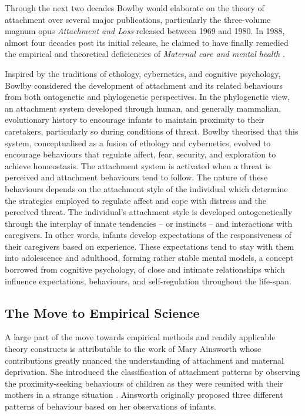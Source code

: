 \documentclass[12pt]{report}
\begin{document}
Through the next two decades Bowlby would elaborate on the theory of attachment over several major publications, particularly the three-volume magnum opus \textit{Attachment and Loss} \cite{Bowlby1969attachment, Bowlby1973separation,Bowlby1980loss} released between 1969 and 1980.
In 1988, almost four decades post its initial release, he claimed to have finally remedied the empirical and theoretical deficiencies of \textit{Maternal care and mental health} \cite{Bowlby1988}.

Inspired by the traditions of ethology, cybernetics, and cognitive psychology, Bowlby considered the development of attachment and its related behaviours from both ontogenetic and phylogenetic perspectives.
In the phylogenetic view, an attachment system developed through human, and generally mammalian, evolutionary history to encourage infants to maintain proximity to their caretakers, particularly so during conditions of threat.
Bowlby theorised that this system, conceptualised as a fusion of ethology and cybernetics, evolved to encourage behaviours that regulate affect, fear, security, and exploration to achieve homeostasis.
The attachment system is activated when a threat is perceived and attachment behaviours tend to follow. The nature of these behaviours depends on the attachment style of the individual which determine the strategies employed to regulate affect and cope with distress and the perceived threat.
The individual's attachment style is developed ontogenetically through the interplay of innate tendencies -- or instincts -- and interactions with caregivers. In other words, infants develop expectations of the responsiveness of their caregivers based on experience.
These expectations tend to stay with them into adolescence and adulthood, forming rather stable mental models, a concept borrowed from cognitive psychology, of close and intimate relationships which influence expectations, behaviours, and self-regulation throughout the life-span.

\subsection{The Move to Empirical Science}
A large part of the move towards empirical methods and readily applicable theory constructs is attributable to the work of Mary Ainsworth whose contributions greatly nuanced the understanding of attachment and maternal deprivation.
She introduced the classification of attachment patterns by observing the proximity-seeking behaviours of children as they were reunited with their mothers in a strange situation  \cite{Ainsworth1979, Ainsworth1970}.
Ainsworth originally proposed three different patterns of behaviour based on her observations of infants.
\end{document}
